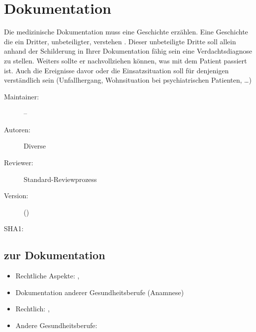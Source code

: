 \def\ChapterCode{DOK}
\chapter
[\CO{[DOK]} Dokumentation]
{Dokumentation}
\label{chp:DOK}

\ChapterIntro
{%
Die medizinische Dokumentation
muss eine Geschichte erzählen. Eine Geschichte die ein
Dritter, unbeteiligter, verstehen . Dieser
unbeteiligte Dritte soll allein anhand der
Schilderung in Ihrer Dokumentation fähig sein eine
Verdachtsdiagnose zu stellen. Weiters sollte er
nachvollziehen können, was mit dem Patient passiert ist.
Auch die Ereignisse davor oder die Einsatzsituation soll
für denjenigen verständlich sein (Unfallhergang,
Wohnsituation bei psychiatrischen Patienten, \ldots)
}
{%
\begin{description}
  \item[Maintainer:] --
  \item[Autoren:] Diverse
  \item[Reviewer:] Standard-Reviewprozess
  \item[Version:] {\VarDocVersionTypeName} ({\VarDocVersionTypeDescription})
  \item[SHA1:] {\DocGitCommit}
\end{description}

{\TxTeilkapitelAASS}
}








% 
% 
% 
% 
% 
% 

\clearpage %

\section{ zur Dokumentation}

\label{topic:dokumentation-medizinisch}

\TextSlide{\TxQuerverweise}
{%
\begin{itemize}
  \item Rechtliche Aspekte:
  ,
  \item Dokumentation anderer Gesundheitsberufe (Anamnese)
\end{itemize}
}{%
\begin{itemize}
  \item Rechtlich:
  ,
  \item Andere Gesundheitsberufe:
\end{itemize}
}{}{}{}


